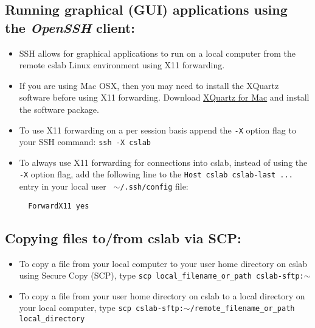 \documentclass[12pt]{article}
\newcommand{\question}[1] %
{
\refstepcounter{questions} %
\goodbreak
\par\noindent %
\phantomsection %
\addcontentsline{faq}{questions}{#1} %
\todo[inline, color=green!40]{\textbf{#1}} %
}
\begin{document}
\begin{flushleft}
\subsection*{Running graphical (GUI) applications using the \textit{OpenSSH} client:}
\begin{itemize}
  \item SSH allows for graphical applications to run on a local computer from the remote cslab Linux environment using X11 forwarding.
  \item If you are using Mac OSX, then you may need to install the XQuartz software before using X11 forwarding. Download \href{https://www.xquartz.org}{XQuartz for Mac} and install the software package.
  \item To use X11 forwarding on a per session basis append the \texttt{-X} option flag to your SSH command: \break
  \texttt{ssh -X cslab}
  \item To always use X11 forwarding for connections into cslab, instead of using the \texttt{-X} option flag, add the following line to the \texttt{Host cslab cslab-last ...} entry in your local user \texttt{ $\sim$/.ssh/config} file:
  \begin{verbatim}
  ForwardX11 yes
  \end{verbatim}
\end{itemize} 



\subsection*{Copying files to/from cslab via SCP:}
\begin{itemize}
\item To copy a file from your local computer to your user home directory on cslab using Secure Copy (SCP), type \break
\texttt{scp local\_filename\_or\_path cslab-sftp:$\sim$}

\item To copy a file from your user home directory on cslab to a local directory on your local computer, type \break
\texttt{scp cslab-sftp:$\sim$/remote\_filename\_or\_path local\_directory}
\end{itemize}


\end{flushleft}
\end{document}
